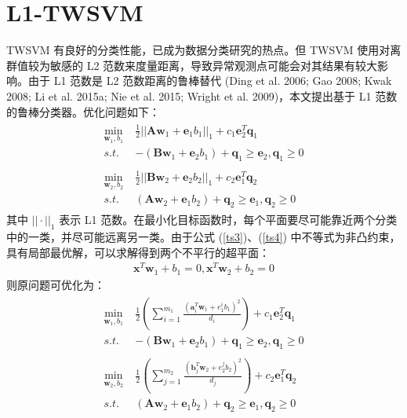\section{L1-TWSVM}
TWSVM 有良好的分类性能，已成为数据分类研究的热点。但 TWSVM 使用对离群值较为敏感的 L2 范数来度量距离，导致异常观测点可能会对其结果有较大影响。由于 L1 范数是 L2 范数距离的鲁棒替代 (Ding et al. 2006; Gao 2008; Kwak 2008; Li et al. 2015a; Nie et al. 2015; Wright et al. 2009)，本文提出基于 L1 范数的鲁棒分类器。优化问题如下：
\begin{align}
\begin{split}
\label{ts3}
	\min\limits_{\mathbf{w}_1,b_1} \;& \frac{1}{2}||\mathbf{Aw}_1+\mathbf{e}_1b_1||_1+c_1\mathbf{e}_2^T\mathbf{q}_1 \\
	s.t.\;& -(\mathbf{Bw}_1+\mathbf{e}_2b_1)+\mathbf{q}_1 \geq \mathbf{e}_2,\mathbf{q}_1\geq 0
\end{split}
\\
\begin{split}
\label{ts4}
	\min\limits_{\mathbf{w}_2,b_2} \;& \frac{1}{2}||\mathbf{Bw}_2+\mathbf{e}_2b_2||_1+c_2\mathbf{e}_1^T\mathbf{q}_2 \\
	s.t. \; &(\mathbf{Aw}_2+\mathbf{e}_1b_2)+\mathbf{q}_2\geq \mathbf{e}_1, \mathbf{q}_2\geq 0
\end{split}	
\end{align}
其中 $||\cdot||_1$ 表示 L1 范数。在最小化目标函数时，每个平面要尽可能靠近两个分类中的一类，并尽可能远离另一类。由于公式 (\ref{ts3})、(\ref{ts4}) 中不等式为非凸约束，具有局部最优解，可以求解得到两个不平行的超平面：
\begin{align}
	\mathbf{x}^T\mathbf{w}_1+b_1=0, \mathbf{x}^T\mathbf{w}_2+b_2=0
\end{align}
则原问题可优化为：
\begin{align}
\begin{split}
\label{ts5}
	\min\limits_{\mathbf{w}_1,b_1} \;& \frac{1}{2}(\sum_{i=1}^{m_1}\frac{(\mathbf{a}_i^T\mathbf{w}_1+e_1^ib_1)^2}{d_i})+c_1\mathbf{e}_2^T\mathbf{q}_1  \\
	s.t.\;& -(\mathbf{Bw}_1+\mathbf{e}_2b_1)+\mathbf{q}_1 \geq \mathbf{e}_2,\mathbf{q}_1\geq 0
\end{split}
\\
\begin{split}
	\min\limits_{\mathbf{w}_2,b_2} \;& \frac{1}{2}(\sum_{j=1}^{m_2}\frac{(\mathbf{b}_j^T\mathbf{w}_2+e_2^jb_2)^2}{d_j})+c_2\mathbf{e}_1^T\mathbf{q}_2  \\
	s.t. \; &(\mathbf{Aw}_2+\mathbf{e}_1b_2)+\mathbf{q}_2\geq \mathbf{e}_1, \mathbf{q}_2\geq 0
\end{split}
\end{align}
